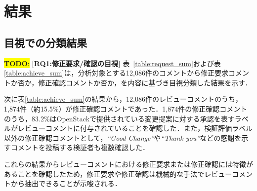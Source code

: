 \documentclass[11pt]{jreport}
\newcommand{\todo}[1]{\colorbox{yellow}{{\bf TODO}:}{\color{red} {\textbf{[#1]}}}}
\begin{document}
\section{結果}
\subsection{目視での分類結果}

\todo{RQ1:修正要求/確認の目視}
表~\ref{table:request_sum}および表\ref{table:achieve_sum}は，分析対象とする12,086件のコメントから修正要求コメントか否か，修正確認コメントか否か，を内容に基づき目視分類した結果を示す．

次に表\ref{table:achieve_sum}の結果から，12,086件のレビューコメントのうち，1,874件（約15.5\%）が修正確認コメントであった．1,874件の修正確認コメントのうち，83.2\%はOpenStackで提供されている変更提案に対する承認を表すラベルがレビューコメントに付与されていることを確認した．また，検証評価ラベル以外の修正確認コメントとして，\textit{``Good Change''}や\textit{``Thank you''}などの感謝を示すコメントを投稿する検証者も複数確認した．

これらの結果からレビューコメントにおける修正要求または修正確認には特徴があることを確認したため，修正要求や修正確認は機械的な手法でレビューコメントから抽出できることが示唆される．

\begin{table}[t]
\centering
  \caption{修正確認に含まれていた内容}
  \label{table:achieve_sum}
\end{table}
\end{document}
